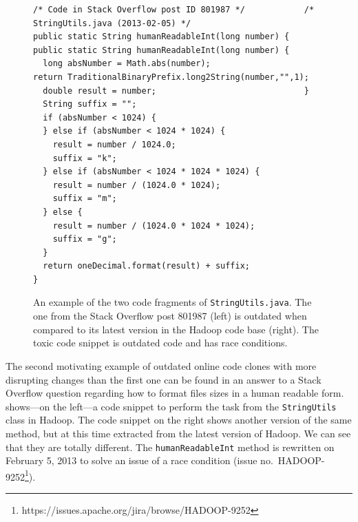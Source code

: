 \documentclass[10pt,journal,compsoc]{IEEEtran}
\begin{document}
\begin{figure}
	\begin{lstlisting}
/* Code in Stack Overflow post ID 801987 */            /* StringUtils.java (2013-02-05) */
public static String humanReadableInt(long number) {   public static String humanReadableInt(long number) {
  long absNumber = Math.abs(number);                     return TraditionalBinaryPrefix.long2String(number,"",1);
  double result = number;                              }
  String suffix = "";
  if (absNumber < 1024) {
  } else if (absNumber < 1024 * 1024) {
    result = number / 1024.0;
    suffix = "k";
  } else if (absNumber < 1024 * 1024 * 1024) {
    result = number / (1024.0 * 1024);
    suffix = "m";
  } else {
    result = number / (1024.0 * 1024 * 1024);
    suffix = "g";
  }
  return oneDecimal.format(result) + suffix;
}
	\end{lstlisting}\vspace{-2ex}
	\caption{An example of the two code fragments of
		{\small\texttt{StringUtils.java}}. The one from the
		Stack Overflow post 801987 (left) is outdated when compared to
		its latest version in the \textsf{Hadoop} code base
		(right). The toxic code snippet is outdated code and has race conditions.}
	\label{fig:before-after_2}
\end{figure}

The second motivating example of outdated online code clones with more
disrupting changes than the first one  can be found in an answer to a Stack
Overflow question regarding how to format files sizes in a human readable form.
 shows---on the left---a code snippet to perform the
task from the {\small{\texttt{StringUtils}}} class in \textsf{Hadoop}. The code snippet on the
right shows another version of the same method, but at this time extracted from
the latest version of \textsf{Hadoop}. We can see that
they are totally different. The {\small{\texttt{humanReadableInt}}} method is
rewritten on February 5, 2013 to solve an issue of a race condition
(issue no.~HADOOP-9252\footnote{https://issues.apache.org/jira/browse/HADOOP-9252}).
\end{document}
